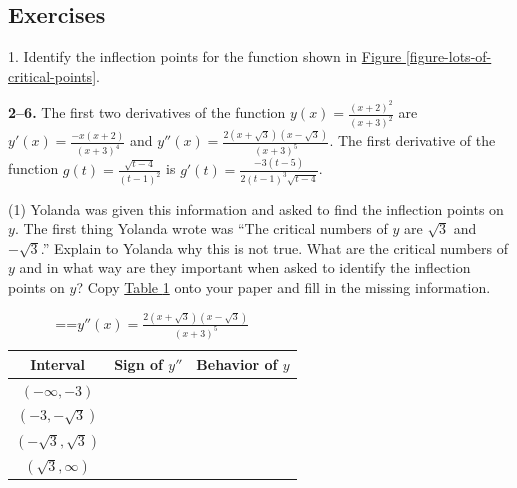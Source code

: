 \documentclass[10pt,oneside,]{book}
\theoremstyle{plain}
\theoremstyle{definition}
\numberwithin{equation}{section}
\newcommand{\fe}[2]{#1\mathopen{}\left(#2\right)\mathclose{}}
\newcommand{\ointerval}[2]{\left(#1,#2\right)}
\newcommand{\fd}[1]{#1'}
\newcommand{\sd}[1]{#1''}
\begin{document}
\subsection[Exercises]{Exercises}\label{exercises-59}
\begin{exerciselist}
\item[1.]\hypertarget{exercise-598}{\null}Identify the inflection points for the function shown in \hyperref[figure-lots-of-critical-points]{Figure \ref{figure-lots-of-critical-points}}.%
\par\smallskip
\textbf{2--6. }\hypertarget{exercisegroup-117}{\null}The first two derivatives of the function \(\fe{y}{x}=\frac{(x+2)^2}{(x+3)^2}\) are \(\fe{\fd{y}}{x}=\frac{-x(x+2)}{(x+3)^4}\) and \(\fe{\sd{y}}{x}=\frac{2(x+\sqrt{3})(x-\sqrt{3})}{(x+3)^5}\). The first derivative of the function \(\fe{g}{t}=\frac{\sqrt{t-4}}{(t-1)^2}\) is \(\fe{\fd{g}}{t}=\frac{-3(t-5)}{2(t-1)^3\sqrt{t-4}}\).%
\par
\begin{exercisegroup}(1)
\exercise[2.]\hypertarget{exercise-599}{\null}Yolanda was given this information and asked to find the inflection points on \(y\).  The first thing Yolanda wrote was ``The critical numbers of \(y\) are \(\sqrt{3}\) and \(-\sqrt{3}\).''  Explain to Yolanda why this is not true.%
\exercise[3.]\hypertarget{exercise-600}{\null}What are the critical numbers of \(y\) and in what way are they important when asked to identify the inflection points on \(y\)?%
\exercise[4.]\hypertarget{exercise-601}{\null}Copy \hyperref[table-second-derivative-signs]{Table \ref{table-second-derivative-signs}} onto your paper and fill in the missing information.%
\begin{table}
\centering
\caption{\binoppenalty=\maxdimen \relpenalty=\maxdimen \(\fe{\sd{y}}{x}=\frac{2\left(x+\sqrt{3}\right)\left(x-\sqrt{3}\right)}{(x+3)^5}\)\label{table-second-derivative-signs}}
\begin{tabular}{cp{1.5in}p{1.5in}}
\toprule
Interval&\multicolumn{1}{c}{Sign of \(\sd{y}\)}&\multicolumn{1}{c}{Behavior of \(y\)}\\
\midrule
\(\ointerval{-\infty}{-3}\)&&\\
\midrule
\(\ointerval{-3}{-\sqrt{3}}\)&&\\
\midrule
\(\ointerval{-\sqrt{3}}{\sqrt{3}}\)&&\\
\midrule
\(\ointerval{\sqrt{3}}{\infty}\)&&\\
\bottomrule
\end{tabular}
\end{table}

\end{exercisegroup}
\end{exerciselist}
\end{document}
